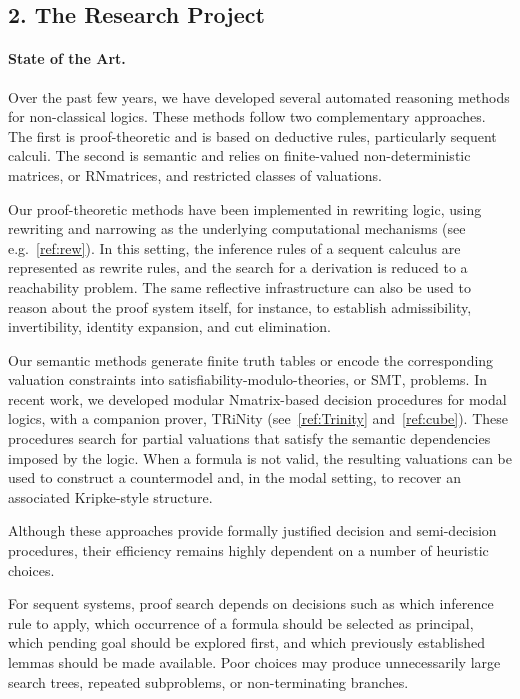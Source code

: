\documentclass[a4paper]{article}
\newcommand{\TODO}[1]{{\color{red}TODO: #1}}
\begin{document}

\subsection*{2. The Research Project}

\paragraph{State of the Art.}
Over the past few years, we have developed several automated reasoning methods for non-classical logics. These methods follow two complementary approaches. The first is proof-theoretic and is based on deductive rules, particularly sequent calculi. The second is semantic and relies on finite-valued non-deterministic matrices, or RNmatrices, and restricted classes of valuations.

Our proof-theoretic methods have been implemented in rewriting logic, using rewriting and narrowing as the underlying computational mechanisms (see e.g.~\ref{ref:rew}). In this setting, the inference rules of a sequent calculus are represented as rewrite rules, and the search for a derivation is reduced to a reachability problem. The same reflective infrastructure can also be used to reason about the proof system itself, for instance, to establish admissibility, invertibility, identity expansion, and cut elimination.

Our semantic methods generate finite truth tables or encode the corresponding valuation constraints into satisfiability-modulo-theories, or SMT, problems. In recent work, we developed modular Nmatrix-based decision procedures for modal logics, with a companion prover, TRiNity (see~\ref{ref:Trinity} and~\ref{ref:cube}). These procedures search for partial valuations that satisfy the semantic dependencies imposed by the logic. When a formula is not valid, the resulting valuations can be used to construct a countermodel and, in the modal setting, to recover an associated Kripke-style structure.

Although these approaches provide formally justified decision and semi-decision procedures, their efficiency remains highly dependent on a number of heuristic choices.

For sequent systems, proof search depends on decisions such as which inference rule to apply, which occurrence of a formula should be selected as principal, which pending goal should be explored first, and which previously established lemmas should be made available. Poor choices may produce unnecessarily large search trees, repeated subproblems, or non-terminating branches.
\end{document}
